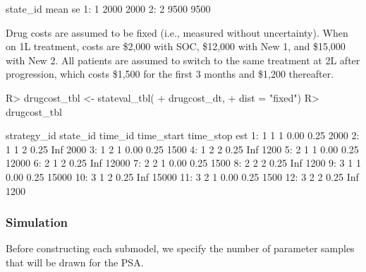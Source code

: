 \documentclass[article, nojss]{jss}\usepackage[]{graphicx}\usepackage[]{color}
\begin{document}
\begin{Schunk}
\begin{Soutput}
   state_id mean   se
1:        1 2000 2000
2:        2 9500 9500
\end{Soutput}
\end{Schunk}

Drug costs are assumed to be fixed (i.e., measured without uncertainty). When on 1L treatment, costs are \$2,000 with SOC, \$12,000 with New 1, and \$15,000 with New 2. All patients are assumed to switch to the same treatment at 2L after progression, which costs \$1,500 for the first 3 months and \$1,200 thereafter.



\begin{Schunk}
\begin{Sinput}
R> drugcost_tbl <- stateval_tbl(
+    drugcost_dt,
+    dist = "fixed")
R> drugcost_tbl
\end{Sinput}
\begin{Soutput}
    strategy_id state_id time_id time_start time_stop   est
 1:           1        1       1       0.00      0.25  2000
 2:           1        1       2       0.25       Inf  2000
 3:           1        2       1       0.00      0.25  1500
 4:           1        2       2       0.25       Inf  1200
 5:           2        1       1       0.00      0.25 12000
 6:           2        1       2       0.25       Inf 12000
 7:           2        2       1       0.00      0.25  1500
 8:           2        2       2       0.25       Inf  1200
 9:           3        1       1       0.00      0.25 15000
10:           3        1       2       0.25       Inf 15000
11:           3        2       1       0.00      0.25  1500
12:           3        2       2       0.25       Inf  1200
\end{Soutput}
\end{Schunk}

\subsubsection{Simulation}
Before constructing each submodel, we specify the number of parameter samples that will be drawn for the PSA.
\end{document}
